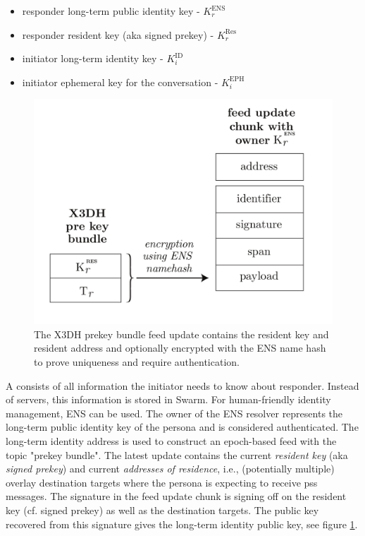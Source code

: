 \begin{itemize}
\item responder long-term public identity key - $K^{\mathrm{ENS}}_r$
\item responder resident key (aka signed prekey) - $K^{\mathrm{Res}}_r$
\item initiator long-term identity key - $K^{\mathrm{ID}}_i$
\item initiator ephemeral key for the conversation - $K^{\mathrm{EPH}}_i$
\end{itemize}{}



\begin{figure}[htbp]
   \centering
   \includegraphics[width=.6\textwidth]{fig/x3dh-prekey-bundle-feed-update.pdf}
   \caption[X3DH prekey bundle feed update \statusgreen]{The X3DH prekey bundle feed update contains the resident key and resident address and optionally encrypted with the ENS name hash to prove uniqueness and require authentication.}
\label{fig:prekey-bundle-feed-update}
\end{figure}


A  consists of all information the initiator needs to know about responder. Instead of servers, this information is stored in Swarm. For human-friendly identity management, ENS can be used. The owner of the ENS resolver represents the long-term public identity key of the persona and is considered authenticated. The long-term identity address is used to construct an epoch-based feed with the topic "prekey bundle". The latest update contains the current \emph{resident key} (aka \emph{signed prekey}) and current \emph{addresses of residence}, i.e., (potentially multiple) overlay destination targets where the persona is expecting to receive pss messages. The signature in the feed update chunk is signing off on the resident key (cf. signed prekey) as well as the destination targets. The public key recovered from this signature gives the long-term identity public key, see figure \ref{fig:prekey-bundle-feed-update}.


